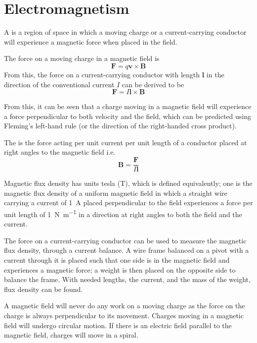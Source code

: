 \documentclass[Physics.tex]{subfiles}
\begin{document}
\chapter{Electromagnetism}
A  is a region of space in which a moving charge or a current-carrying conductor will experience a magnetic force when placed in the field.

The force on a moving charge in a magnetic field is \begin{equation}\mathbf{F} = q\mathbf{v} \times \mathbf{B}\end{equation} From this, the force on a current-carrying conductor with length \(\mathbf{l}\) in the direction of the conventional current \(I\) can be derived to be \begin{equation}\mathbf{F} = I\mathbf{l}\times\mathbf{B}\end{equation}

From this, it can be seen that a charge moving in a magnetic field will experience a force perpendicular to both velocity and the field, which can be predicted using Fleming's left-hand rule (or the direction of the right-handed cross product).

The  is the force acting per unit current per unit length of a conductor placed at right angles to the magnetic field i.e. \begin{equation}\mathbf{B} = \frac{\mathbf{F}}{I\mathbf{l}}\end{equation}

Magnetic flux density has units tesla (\si{\tesla}), which is defined equivalently; one  is the magnetic flux density of a uniform magnetic field in which a straight wire carrying a current of \SI{1}{\ampere} placed perpendicular to the field experiences a force per unit length of \SI{1}{\newton\per\meter} in a direction at right angles to both the field and the current.

The force on a current-carrying conductor can be used to measure the magnetic flux density, through a current balance. A wire frame balanced on a pivot with a current through it is placed such that one side is in the magnetic field and experiences a magnetic force; a weight is then placed on the opposite side to balance the frame. With needed lengths, the current, and the mass of the weight, flux density can be found.

A magnetic field will never do any work on a moving charge as the force on the charge is always perpendicular to its movement. Charges moving in a magnetic field will undergo circular motion. If there is an electric field parallel to the magnetic field, charges will move in a spiral.
\end{document}
